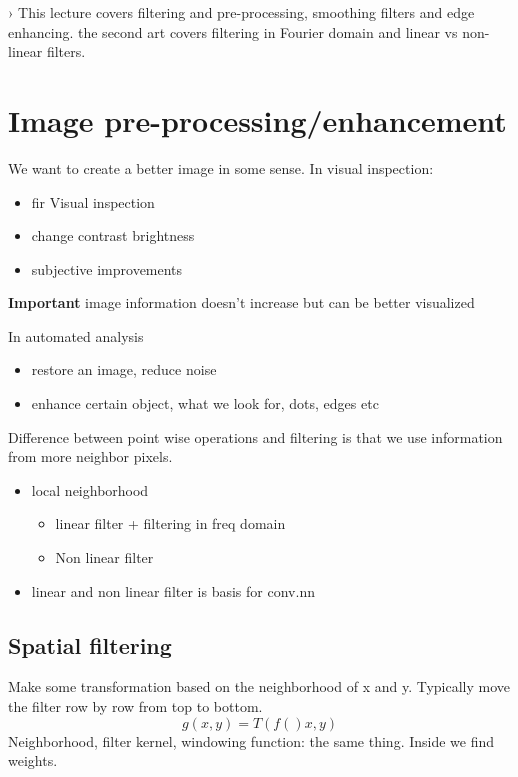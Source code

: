 ›
This lecture covers filtering and pre-processing, smoothing filters and edge enhancing. the second art covers filtering in Fourier domain and linear vs non-linear filters. 

\section{Image pre-processing/enhancement}

We want to create a better image in some sense. In visual inspection:
\begin{itemize}
	\item fir Visual inspection
	\item change contrast brightness
	\item subjective improvements
\end{itemize}

\textbf{Important} image information doesn't increase but can be better visualized 

In automated analysis
\begin{itemize}
	\item restore an image, reduce noise
	\item enhance certain object, what we look for, dots, edges etc
\end{itemize}

Difference between point wise operations and filtering is that we use information from more neighbor pixels. 

\begin{itemize}
	\item local neighborhood
	\begin{itemize}
		\item linear filter + filtering in freq domain
		\item Non linear filter
	\end{itemize}
	\item linear and non linear filter is basis for conv.nn
\end{itemize}

\subsection*{Spatial filtering}
Make some transformation based on the neighborhood of x and y. Typically move the filter row by row from top to bottom. 
\begin{equation}
	g(x,y) = T(f()x,y)
\end{equation}
Neighborhood, filter kernel, windowing function: the same thing. Inside we find weights. 

